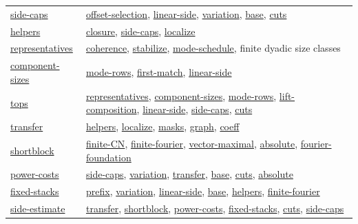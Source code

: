 \documentclass[11pt]{article}
\theoremstyle{definition}
\numberwithin{equation}{section}
\begin{document}
\begin{longtable}{@{}p{}p{}@{}}
\hyperlink{bp:side-caps}{side-caps} & \hyperlink{bp:offset-selection}{offset-selection}, \hyperlink{bp:linear-side}{linear-side}, \hyperlink{bp:variation}{variation}, \hyperlink{bp:base}{base}, \hyperlink{bp:cuts}{cuts}\\[3pt]
\hyperlink{bp:helpers}{helpers} & \hyperlink{bp:closure}{closure}, \hyperlink{bp:side-caps}{side-caps}, \hyperlink{bp:localize}{localize}\\[3pt]
\hyperlink{bp:representatives}{representatives} & \hyperlink{bp:coherence}{coherence}, \hyperlink{bp:stabilize}{stabilize}, \hyperlink{bp:mode-schedule}{mode-schedule}, finite dyadic size classes\\[3pt]
\hyperlink{bp:component-sizes}{component-sizes} & \hyperlink{bp:mode-rows}{mode-rows}, \hyperlink{bp:first-match}{first-match}, \hyperlink{bp:linear-side}{linear-side}\\[3pt]
\hyperlink{bp:tops}{tops} & \hyperlink{bp:representatives}{representatives}, \hyperlink{bp:component-sizes}{component-sizes}, \hyperlink{bp:mode-rows}{mode-rows}, \hyperlink{bp:lift-composition}{lift-composition}, \hyperlink{bp:linear-side}{linear-side}, \hyperlink{bp:side-caps}{side-caps}, \hyperlink{bp:cuts}{cuts}\\[3pt]
\hyperlink{bp:transfer}{transfer} & \hyperlink{bp:helpers}{helpers}, \hyperlink{bp:localize}{localize}, \hyperlink{bp:masks}{masks}, \hyperlink{bp:graph}{graph}, \hyperlink{bp:coeff}{coeff}\\[3pt]
\hyperlink{bp:shortblock}{shortblock} & \hyperlink{bp:finite-CN}{finite-CN}, \hyperlink{bp:finite-fourier}{finite-fourier}, \hyperlink{bp:vector-maximal}{vector-maximal}, \hyperlink{bp:absolute}{absolute}, \hyperlink{bp:fourier-foundation}{fourier-foundation}\\[3pt]
\hyperlink{bp:power-costs}{power-costs} & \hyperlink{bp:side-caps}{side-caps}, \hyperlink{bp:variation}{variation}, \hyperlink{bp:transfer}{transfer}, \hyperlink{bp:base}{base}, \hyperlink{bp:cuts}{cuts}, \hyperlink{bp:absolute}{absolute}\\[3pt]
\hyperlink{bp:fixed-stacks}{fixed-stacks} & \hyperlink{bp:prefix}{prefix}, \hyperlink{bp:variation}{variation}, \hyperlink{bp:linear-side}{linear-side}, \hyperlink{bp:base}{base}, \hyperlink{bp:helpers}{helpers}, \hyperlink{bp:finite-fourier}{finite-fourier}\\[3pt]
\hyperlink{bp:side-estimate}{side-estimate} & \hyperlink{bp:transfer}{transfer}, \hyperlink{bp:shortblock}{shortblock}, \hyperlink{bp:power-costs}{power-costs}, \hyperlink{bp:fixed-stacks}{fixed-stacks}, \hyperlink{bp:cuts}{cuts}, \hyperlink{bp:side-caps}{side-caps}\\[3pt]

\end{longtable}
\end{document}
